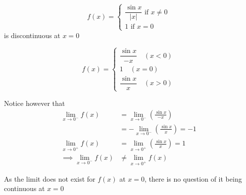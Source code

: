 \documentclass[14pt,fleqn]{extarticle}
\begin{document}
 
\begin{snippet}
    \correct
    
    \[ f(x) = \begin{cases}
    \dfrac{\sin x}{\vert x\vert }\text{ if } x \neq 0 \\
    1\text{ if } x = 0 
    \end{cases} \]
    is discontinuous at $ x = 0$ 
    
    \reason
    
    \[ f(x) = \begin{cases} 
    \dfrac{\sin x}{-x}\quad \left(x < 0 \right) \\
    1 \quad \left(x =0 \right) \\
    \dfrac{\sin x}{x} \quad \left(x > 0 \right)
    \end{cases} \]
    
    Notice however that 
    \begin{align}
	\lim_{x\to 0^-} f(x) &= \lim_{x\to 0^-} \left(\frac{\sin x}{-x} \right) \\
	&= -\lim_{x\to 0^-} \left(\frac{\sin x}{x} \right)= -1 \\
	\lim_{x\to 0^+} f(x) &= \lim_{x\to 0^+} \left(\frac{\sin x}{x} \right) = 1 \\
	\implies \lim_{x\to 0^-} f(x) &\neq \lim_{x\to 0^+} f(x) 
\end{align}

As the limit does not exist for $f(x)$ at $x = 0$, there is no question 
of it being continuous at $x=0$ 
    
\end{snippet} 
\end{document}

